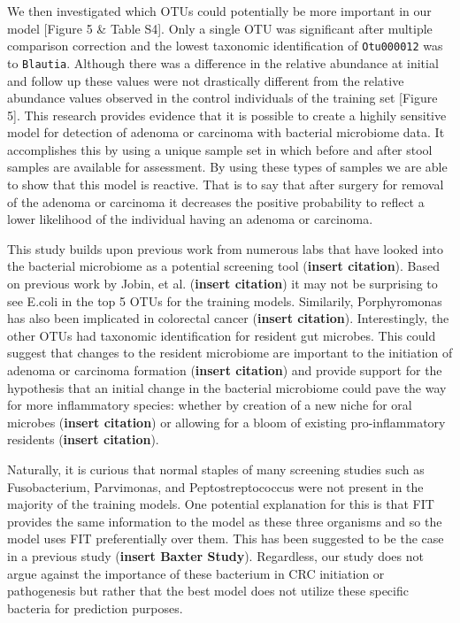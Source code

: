 \documentclass[12pt,]{article}
\begin{document}
We then investigated which OTUs could potentially be more important in
our model {[}Figure 5 \& Table S4{]}. Only a single OTU was significant
after multiple comparison correction and the lowest taxonomic
identification of \texttt{Otu000012} was to \texttt{Blautia}. Although
there was a difference in the relative abundance at initial and follow
up these values were not drastically different from the relative
abundance values observed in the control individuals of the training set
{[}Figure 5{]}. This research provides evidence that it is possible to
create a highily sensitive model for detection of adenoma or carcinoma
with bacterial microbiome data. It accomplishes this by using a unique
sample set in which before and after stool samples are available for
assessment. By using these types of samples we are able to show that
this model is reactive. That is to say that after surgery for removal of
the adenoma or carcinoma it decreases the positive probability to
reflect a lower likelihood of the individual having an adenoma or
carcinoma.

This study builds upon previous work from numerous labs that have looked
into the bacterial microbiome as a potential screening tool
(\textbf{insert citation}). Based on previous work by Jobin, et al.
(\textbf{insert citation}) it may not be surprising to see E.coli in the
top 5 OTUs for the training models. Similarily, Porphyromonas has also
been implicated in colorectal cancer (\textbf{insert citation}).
Interestingly, the other OTUs had taxonomic identification for resident
gut microbes. This could suggest that changes to the resident microbiome
are important to the initiation of adenoma or carcinoma formation
(\textbf{insert citation}) and provide support for the hypothesis that
an initial change in the bacterial microbiome could pave the way for
more inflammatory species: whether by creation of a new niche for oral
microbes (\textbf{insert citation}) or allowing for a bloom of existing
pro-inflammatory residents (\textbf{insert citation}).

Naturally, it is curious that normal staples of many screening studies
such as Fusobacterium, Parvimonas, and Peptostreptococcus were not
present in the majority of the training models. One potential
explanation for this is that FIT provides the same information to the
model as these three organisms and so the model uses FIT preferentially
over them. This has been suggested to be the case in a previous study
(\textbf{insert Baxter Study}). Regardless, our study does not argue
against the importance of these bacterium in CRC initiation or
pathogenesis but rather that the best model does not utilize these
specific bacteria for prediction purposes.
\end{document}
